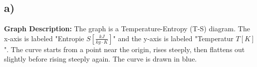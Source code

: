 

\subsection*{a)}
\begin{center}
\textbf{Graph Description:} The graph is a Temperature-Entropy (T-S) diagram. The x-axis is labeled "Entropie $S \left[ \frac{kJ}{kg \cdot K} \right]$" and the y-axis is labeled "Temperatur $T \left[ K \right]$". The curve starts from a point near the origin, rises steeply, then flattens out slightly before rising steeply again. The curve is drawn in blue.
\end{center}